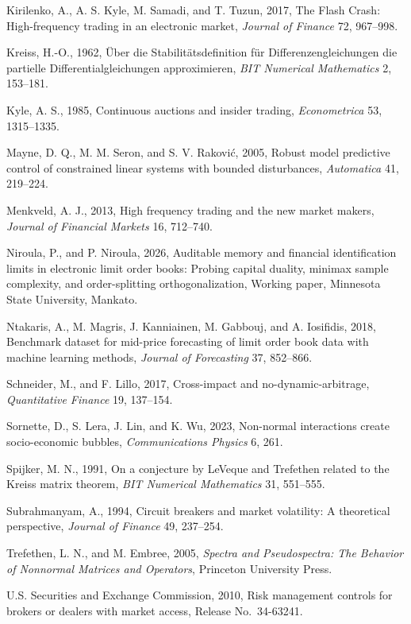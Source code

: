 \documentclass[11pt]{article}
\theoremstyle{remark}
\begin{document}
Kirilenko, A., A. S. Kyle, M. Samadi, and T. Tuzun, 2017, The Flash Crash: High-frequency trading in an electronic market, \emph{Journal of Finance} 72, 967--998.

Kreiss, H.-O., 1962, \"Uber die Stabilit\"atsdefinition f\"ur Differenzengleichungen die partielle Differentialgleichungen approximieren, \emph{BIT Numerical Mathematics} 2, 153--181.

Kyle, A. S., 1985, Continuous auctions and insider trading, \emph{Econometrica} 53, 1315--1335.

Mayne, D. Q., M. M. Seron, and S. V. Rakovi\'c, 2005, Robust model predictive control of constrained linear systems with bounded disturbances, \emph{Automatica} 41, 219--224.

Menkveld, A. J., 2013, High frequency trading and the new market makers, \emph{Journal of Financial Markets} 16, 712--740.

Niroula, P., and P. Niroula, 2026, Auditable memory and financial identification limits in electronic limit order books: Probing capital duality, minimax sample complexity, and order-splitting orthogonalization, Working paper, Minnesota State University, Mankato.

Ntakaris, A., M. Magris, J. Kanniainen, M. Gabbouj, and A. Iosifidis, 2018, Benchmark dataset for mid-price forecasting of limit order book data with machine learning methods, \emph{Journal of Forecasting} 37, 852--866.

Schneider, M., and F. Lillo, 2017, Cross-impact and no-dynamic-arbitrage, \emph{Quantitative Finance} 19, 137--154.

Sornette, D., S. Lera, J. Lin, and K. Wu, 2023, Non-normal interactions create socio-economic bubbles, \emph{Communications Physics} 6, 261.

Spijker, M. N., 1991, On a conjecture by LeVeque and Trefethen related to the Kreiss matrix theorem, \emph{BIT Numerical Mathematics} 31, 551--555.

Subrahmanyam, A., 1994, Circuit breakers and market volatility: A theoretical perspective, \emph{Journal of Finance} 49, 237--254.

Trefethen, L. N., and M. Embree, 2005, \emph{Spectra and Pseudospectra: The Behavior of Nonnormal Matrices and Operators}, Princeton University Press.

U.S. Securities and Exchange Commission, 2010, Risk management controls for brokers or dealers with market access, Release No.\ 34-63241.
\end{document}
